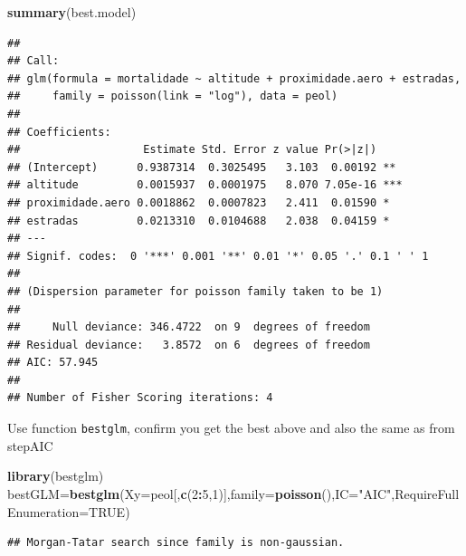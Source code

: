 \documentclass[
]{book}
\newenvironment{Shaded}{\begin{snugshade}}{\end{snugshade}}
\newcommand{\AttributeTok}[1]{\textcolor[rgb]{0.13,0.29,0.53}{#1}}
\newcommand{\ConstantTok}[1]{\textcolor[rgb]{0.56,0.35,0.01}{#1}}
\newcommand{\DecValTok}[1]{\textcolor[rgb]{0.00,0.00,0.81}{#1}}
\newcommand{\FunctionTok}[1]{\textcolor[rgb]{0.13,0.29,0.53}{\textbf{#1}}}
\newcommand{\NormalTok}[1]{#1}
\newcommand{\OtherTok}[1]{\textcolor[rgb]{0.56,0.35,0.01}{#1}}
\newcommand{\SpecialCharTok}[1]{\textcolor[rgb]{0.81,0.36,0.00}{\textbf{#1}}}
\newcommand{\StringTok}[1]{\textcolor[rgb]{0.31,0.60,0.02}{#1}}
\begin{document}
\begin{Shaded}
\begin{Highlighting}[]
\FunctionTok{summary}\NormalTok{(best.model)}
\end{Highlighting}
\end{Shaded}

\begin{verbatim}
## 
## Call:
## glm(formula = mortalidade ~ altitude + proximidade.aero + estradas, 
##     family = poisson(link = "log"), data = peol)
## 
## Coefficients:
##                   Estimate Std. Error z value Pr(>|z|)    
## (Intercept)      0.9387314  0.3025495   3.103  0.00192 ** 
## altitude         0.0015937  0.0001975   8.070 7.05e-16 ***
## proximidade.aero 0.0018862  0.0007823   2.411  0.01590 *  
## estradas         0.0213310  0.0104688   2.038  0.04159 *  
## ---
## Signif. codes:  0 '***' 0.001 '**' 0.01 '*' 0.05 '.' 0.1 ' ' 1
## 
## (Dispersion parameter for poisson family taken to be 1)
## 
##     Null deviance: 346.4722  on 9  degrees of freedom
## Residual deviance:   3.8572  on 6  degrees of freedom
## AIC: 57.945
## 
## Number of Fisher Scoring iterations: 4
\end{verbatim}

Use function \texttt{bestglm}, confirm you get the best above and also the same as from stepAIC

\begin{Shaded}
\begin{Highlighting}[]
\FunctionTok{library}\NormalTok{(bestglm)}
\NormalTok{bestGLM}\OtherTok{=}\FunctionTok{bestglm}\NormalTok{(}\AttributeTok{Xy=}\NormalTok{peol[,}\FunctionTok{c}\NormalTok{(}\DecValTok{2}\SpecialCharTok{:}\DecValTok{5}\NormalTok{,}\DecValTok{1}\NormalTok{)],}\AttributeTok{family=}\FunctionTok{poisson}\NormalTok{(),}\AttributeTok{IC=}\StringTok{"AIC"}\NormalTok{,}\AttributeTok{RequireFullEnumeration=}\ConstantTok{TRUE}\NormalTok{)}
\end{Highlighting}
\end{Shaded}

\begin{verbatim}
## Morgan-Tatar search since family is non-gaussian.
\end{verbatim}

\begin{Shaded}
\end{Shaded}
\end{document}
